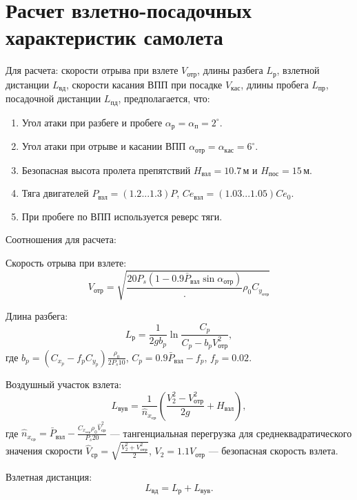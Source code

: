 \section{Расчет взлетно-посадочных характеристик самолета}
Для расчета: скорости отрыва при взлете $V_{отр}$, длины разбега
$L_{р}$, взлетной дистанции $L_{вд}$, скорости касания ВПП при посадке
$V_{кас}$, длины пробега $L_{пр}$, посадочной дистанции $L_{пд}$,
предполагается, что:
\begin{enumerate}
    \item Угол атаки при разбеге и пробеге $\alpha_р = \alpha_{п} = 2^\circ$.
    \item Угол атаки при отрыве и касании ВПП $\alpha_{отр} = \alpha_{кас} = 6^\circ$.
    \item Безопасная высота пролета препятствий $H_{взл} = 10.7\, м$ и $H_{пос} = 15\, м$.
    \item Тяга двигателей $P_{взл} = (1.2 ... 1.3)P$, $Ce_{взл} = (1.03 ... 1.05) Ce_0$. 
    \item При пробеге по ВПП используется реверс тяги.
\end{enumerate}
Соотношения для расчета:

Скорость отрыва при взлете: 
\begin{equation}
    V_{отр} = \sqrt{\frac{20 P_s (1 - 0.9 \bar{P}_{взл} \sin{\alpha_{отр}})}.
    {\rho_0 C_{y_{отр}}}}
\end{equation}

Длина разбега:
\begin{equation}
    L_р = \frac{1}{2 g b_p} \ln{\frac{C_p}{C_p -  b_p V_{отр}^2}},
\end{equation}
где $b_p = (C_{x_p} - f_p C_{y_p}) \frac{\rho_0}{2 P_s 10}$, $C_p = 0.9
\bar{P}_{взл} - f_p$, $f_p = 0.02$.

Воздушный участок взлета:
\begin{equation}
    L_{вув} = \frac{1}{\hat{n}_{x_{ср}}} \left( \frac{V_2^2 - V_{отр}^2}{2g} +
    H_{взл}\right), 
\end{equation}
где  $\hat{n}_{x_{ср}} = \bar{P}_{взл} - \frac{C_{x_{отр}} \rho_0 \hat{V}_{ср}^2}
{P_s 20}$ --- тангенциальная перегрузка для среднеквадратического значения скорости
$\hat{V}_{ср} = \sqrt{\frac{V_2^2 + V_{отр}^2}{2}}$, $V_2 = 1.1 V_{отр}$ --- безопасная скорость взлета. 

Взлетная дистанция:
\begin{equation}
    L_{вд} = L_{р} + L_{вув}.
\end{equation}

